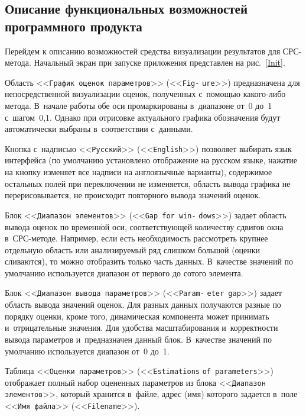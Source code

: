 \begin{multicols}{2}
\section{Описание функциональных возможностей программного продукта}


Перейдем к описанию возможностей средства визуализации результатов для СРС-ме\-то\-да. Начальный экран
при запуске приложения пред\-став\-лен на рис.~\ref{Init}.


Область <<\verb"График оценок параметров">> (<<\verb"Fig-" \verb"ure">>)
предназначена для непосредственной\linebreak
визуализации оценок, полученных с~по\-мощью ка\-ко\-го-ли\-бо метода.
В~начале работы обе оси промаркированы
в~диапазоне от~0 до~1 с~шагом~0,1. Однако при отрисовке актуального
графика обозначения будут
автоматически выбраны в~соответствии с~данными.

Кнопка с~надписью <<\verb"Русский">> (<<\verb"English">>) поз\-во\-ляет выбирать язык интерфейса (по
умолчанию установлено отображение на русском языке, нажатие на кнопку изменяет все надписи на
англоязычные варианты), содержимое остальных полей при переключении не изменяется, область вывода
графика не перерисовывается, не происходит повторного вывода значений оценок.

Блок <<\verb"Диапазон элементов">> (<<\verb"Gap for win-" \verb"dows">>) задает область вывода оценок по
временн$\acute{\mbox{о}}$й оси, соответствующей количеству сдвигов окна в~СРС-ме\-то\-де. Например, если есть
необходимость рассмотреть крупнее отдельную область или анализируемый ряд слишком большой (оценки
сливаются), то можно отобразить только часть данных.
В~качестве значений по умолчанию используется
диапазон от первого до сотого элемента.

Блок <<\verb"Диапазон вывода параметров">> (<<\verb"Param-" \verb"eter gap">>) задает область вывода значений
оценок. Для разных данных получаются разные по порядку оценки, кроме того, динамическая компонента
может принимать и~отрицательные значения. Для удобства масштабирования и~корректности вывода
параметров и~предназначен данный блок. В~качестве значений по умолчанию используется диапазон от~0
до~1.

Таблица <<\verb"Оценки параметров">>
(<<\verb"Estimations" \verb"of parameters">>) отображает полный набор
оцененных параметров из блока <<\verb"Диапазон" \verb"элементов">>, который хранится в~файле, адрес (имя)
которого задается в~поле <<\verb"Имя файла">> (<<\verb"Filename">>).


\end{multicols}
